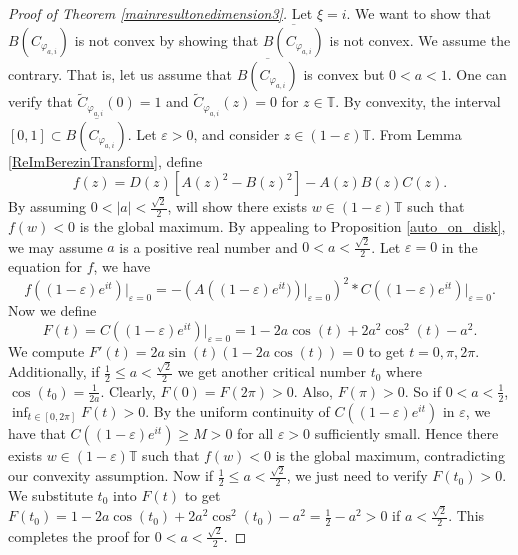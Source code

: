\documentclass{amsart}
\theoremstyle{remark}
\begin{document}
\begin{proof}[Proof of Theorem \ref{mainresultonedimension3}]
Let $\xi=i$. We want to show that $B(C_{\varphi_{a,i}})$ is not convex by showing that $\overline{B(C_{\varphi_{a,i}})}$ is not convex. We assume the contrary.  That is, let us assume that
$\overline{B(C_{\varphi_{a,i}})}$ is convex but $0<a<1$.
One can verify that $\widetilde{C}_{\varphi_{a,i}}(0)=1$ and $\widetilde{C}_{\varphi_{a,i}}(z)=0$ for $z \in \mathbb{T}$. By convexity, the interval $[0,1] \subset \overline{B(C_{\varphi_{a,i}})}$. Let $\varepsilon > 0$, and consider $z \in (1-\varepsilon)\mathbb{T}$. From Lemma \ref{ReImBerezinTransform}, define 
\[f(z)=D(z)[A(z)^2-B(z)^2]-A(z)B(z)C(z).\]
By assuming $0<|a|<\frac{\sqrt{2}}{2}$, will show there exists $w \in (1-\varepsilon)\mathbb{T}$ such that $f(w)<0$ is the global maximum.  By appealing to Proposition \ref{auto_on_disk}, we may assume $a$ is a positive real number and $0<a<\frac{\sqrt{2}}{2}$. 
Let $\varepsilon=0$ in the equation for $f$,  we have
\[f((1-\varepsilon)e^{it})|_{\varepsilon=0}=-\left(A\left((1-\varepsilon)e^{it})\right)\Big|_{\varepsilon=0}\right)^2*C\left((1-\varepsilon)e^{it}\right)\Big|_{\varepsilon=0}.\]
Now we define \[F(t)=C\left((1-\varepsilon)e^{it}\right)\Big|_{\varepsilon=0}=1-2a\cos(t)+2a^2\cos^2(t)-a^2.\]
We compute $F'(t)=2a\sin(t)\left(1-2a\cos(t)\right)=0$ to get
$t=0,\pi,2\pi$.  Additionally, if $\frac{1}{2}\leq a<\frac{\sqrt{2}}{2}$ we get another critical number $t_0$ where $\cos(t_0)=\frac{1}{2a}$.
Clearly, $F(0)=F(2\pi)>0$.  Also, $F(\pi)>0$.  So if $0<a<\frac{1}{2}$, $\displaystyle\inf_{t\in [0,2\pi]}F(t)>0$.  By the uniform continuity of $C\left((1-\varepsilon)e^{it}\right)$ in $\varepsilon$, we have that
$C\left((1-\varepsilon)e^{it}\right)\geq M>0$ for all $\varepsilon>0$ sufficiently small. 
Hence there exists $w \in (1-\varepsilon)\mathbb{T}$ such that $f(w)<0$ is the global maximum, contradicting our convexity assumption.  Now if 
$\frac{1}{2}\leq a<\frac{\sqrt{2}}{2}$, we just need to verify $F(t_0)>0$.
We substitute $t_0$ into $F(t)$ to get
$F(t_0)=1-2a\cos(t_0)+2a^2\cos^2(t_0)-a^2=\frac{1}{2}-a^2>0$ if $a<\frac{\sqrt{2}}{2}$.
This completes the proof for $0<a<\frac{\sqrt{2}}{2}$.


\end{proof}
\end{document}
